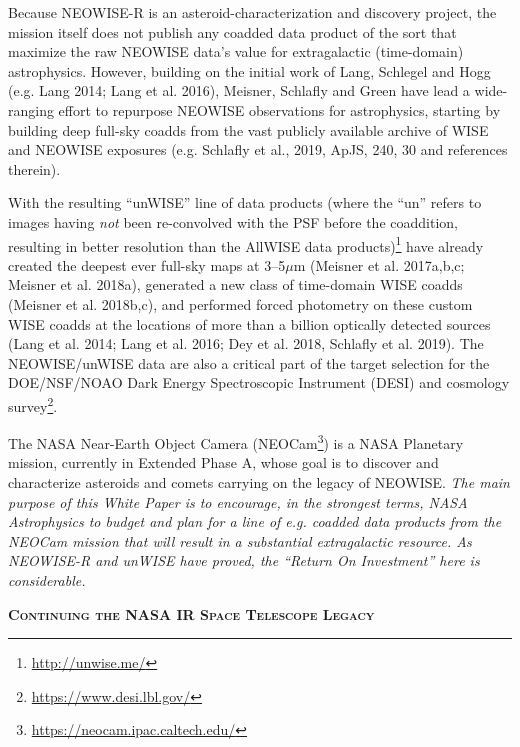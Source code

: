 \documentclass[12pt]{article}
\begin{document}
\smallskip
\smallskip
\noindent
Because NEOWISE-R is an asteroid-characterization and discovery project, the mission itself does not publish any coadded data product of the sort that maximize the raw NEOWISE data’s value for extragalactic (time-domain) astrophysics. However, building on the initial work of Lang, Schlegel and Hogg (e.g. Lang 2014; Lang et al. 2016), Meisner, Schlafly and Green have lead a wide-ranging effort to repurpose NEOWISE observations for astrophysics, starting by building deep full-sky coadds from the vast publicly available archive of WISE and NEOWISE exposures (e.g. Schlafly  et al., 2019, ApJS, 240, 30 and references therein).

\smallskip 
\smallskip
\noindent
With the resulting ``unWISE'' line of data products (where the ``un''
refers to images having {\it not} been re-convolved with the PSF
before the coaddition, resulting in better resolution than the AllWISE
data products)\footnote{\href{http://unwise.me/}{http://unwise.me/}}
have already created the deepest ever full-sky maps at 3–5$\mu$m
(Meisner et al. 2017a,b,c; Meisner et al. 2018a), generated a new
class of time-domain WISE coadds (Meisner et al.  2018b,c), and
performed forced photometry on these custom WISE coadds at the
locations of more than a billion optically detected sources (Lang et
al. 2014; Lang et al. 2016; Dey et al. 2018, Schlafly et
al. 2019). The NEOWISE/unWISE data are also a critical part of the
target selection for the DOE/NSF/NOAO Dark Energy Spectroscopic
Instrument (DESI) and cosmology survey\footnote{\href{https://www.desi.lbl.gov/}{https://www.desi.lbl.gov/}}.

\smallskip
\smallskip 
\noindent
The NASA Near-Earth Object Camera
(NEOCam\footnote{\href{https://neocam.ipac.caltech.edu/}{https://neocam.ipac.caltech.edu/}})
is a NASA Planetary mission, currently in Extended Phase A, whose goal is to
discover and characterize asteroids and comets carrying on the legacy
of NEOWISE. {\it The main purpose of this White Paper is to encourage,
in the strongest terms, NASA Astrophysics to budget and plan for a
line of e.g. coadded data products from the NEOCam mission that will
result in a substantial extragalactic resource. As NEOWISE-R and
unWISE have proved, the ``Return On Investment'' here is
considerable.}


\smallskip
\smallskip
\noindent
{\bfseries \textsc{\textcolor{Cerulean}{Continuing the NASA IR Space Telescope Legacy}}} 
\end{document}
